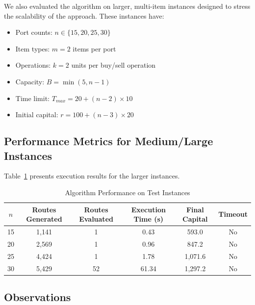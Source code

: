 \documentclass[12pt]{article}
\begin{document}
We also evaluated the algorithm on larger, multi-item instances designed to stress the scalability of the approach. These instances have:
\begin{itemize}
    \item Port counts: $n \in \{15, 20, 25, 30\}$
    \item Item types: $m = 2$ items per port
    \item Operations: $k = 2$ units per buy/sell operation
    \item Capacity: $B = \min(5, n-1)$
    \item Time limit: $T_{max} = 20 + (n-2) \times 10$
    \item Initial capital: $r = 100 + (n-3) \times 20$
\end{itemize}

\subsection{Performance Metrics for Medium/Large Instances}

Table~\ref{tab:performance} presents execution results for the larger instances.

\begin{table}[h]
\centering
\caption{Algorithm Performance on Test Instances}
\label{tab:performance}
\begin{tabular}{c|ccccc}
\toprule
$n$ & Routes Generated & Routes Evaluated & Execution Time (s) & Final Capital & Timeout \\
\midrule
15 & 1,141 & 1 & 0.43 & 593.0 & No \\
20 & 2,569 & 1 & 0.96 & 847.2 & No \\
25 & 4,424 & 1 & 1.78 & 1,071.6 & No \\
30 & 5,429 & 52 & 61.34 & 1,297.2 & No \\
\bottomrule
\end{tabular}
\end{table}

\subsection{Observations}
\end{document}

